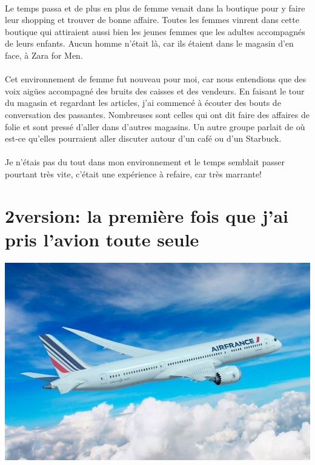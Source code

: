 \paragraph{} Le temps passa et de plus en plus de femme venait dans la boutique
pour y faire leur shopping et trouver de bonne affaire. Toutes les femmes
vinrent dans cette boutique qui attiraient aussi bien les jeunes femmes que les
adultes accompagnés de leurs enfants. Aucun homme n'était là, car ils étaient
dans le magasin d'en face, à Zara for Men.

\paragraph{} Cet environnement de femme fut nouveau pour moi, car nous
entendions que des voix aigües accompagné des bruits des caisses et des
vendeurs. En faisant le tour du magasin et regardant les articles, j'ai
commencé à écouter des bouts de conversation des passantes.  Nombreuses sont
celles qui ont dit faire des affaires de folie et sont pressé d'aller dans
d'autres magasins. Un autre groupe parlait de où est-ce qu'elles pourraient
aller discuter autour d'un café ou d'un Starbuck.

\paragraph{} Je n'étais pas du tout dans mon environnement et le temps semblait
passer pourtant très vite, c'était une expérience à refaire, car très marrante!

\section{2\ieme version: la première fois que j'ai pris l'avion toute seule}

\begin{center}
	\includegraphics[scale=0.6]{avion.jpg}
\end{center}

